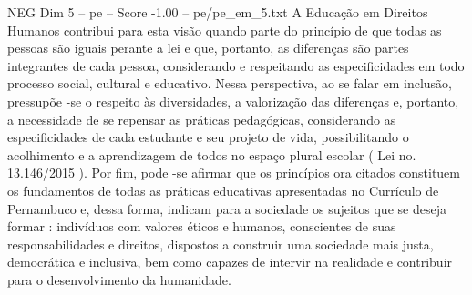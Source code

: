\begin{textsample}{NEG Dim 5 – pe – Score -1.00 – pe/pe\_em\_5.txt}
A Educação em Direitos Humanos contribui para esta visão quando parte do princípio de que todas as pessoas são iguais perante a lei e que, portanto, as diferenças são partes integrantes de cada pessoa, considerando e respeitando as especificidades em todo processo social, cultural e educativo.
Nessa perspectiva, ao se falar em inclusão, pressupõe -se o respeito às diversidades, a valorização das diferenças e, portanto, a necessidade de se repensar as práticas pedagógicas, considerando as especificidades de cada estudante e seu projeto de vida, possibilitando o acolhimento e a aprendizagem de todos no espaço plural escolar ( Lei no. 13.146/2015 ).
Por fim, pode -se afirmar que os princípios ora citados constituem os fundamentos de todas as práticas educativas apresentadas no Currículo de Pernambuco e, dessa forma, indicam para a sociedade os sujeitos que se deseja formar : indivíduos com valores éticos e humanos, conscientes de suas responsabilidades e direitos, dispostos a construir uma sociedade mais justa, democrática e inclusiva, bem como capazes de intervir na realidade e contribuir para o desenvolvimento da humanidade.

\end{textsample}
